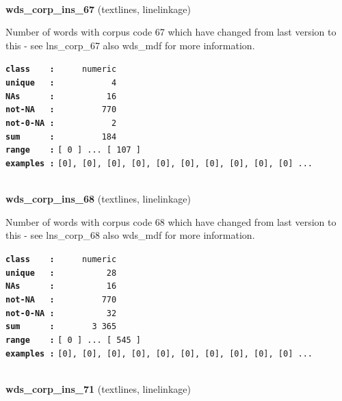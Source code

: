 \documentclass[]{article}
\begin{document}
~

\textbf{wds\_corp\_ins\_67} (textlines, linelinkage)

Number of words with corpus code 67 which have changed from last version
to this - see lns\_corp\_67 also wds\_mdf for more information.

\textbf{\texttt{class\ \ \ \ :}} \texttt{~~~~~numeric}\\
\textbf{\texttt{unique\ \ \ :}} \texttt{~~~~~~~~~~~4}\\
\textbf{\texttt{NAs\ \ \ \ \ \ :}} \texttt{~~~~~~~~~~16}\\
\textbf{\texttt{not-NA\ \ \ :}} \texttt{~~~~~~~~~770}\\
\textbf{\texttt{not-0-NA\ :}} \texttt{~~~~~~~~~~~2}\\
\textbf{\texttt{sum\ \ \ \ \ \ :}} \texttt{~~~~~~~~~184}\\
\textbf{\texttt{range\ \ \ \ :}}
\texttt{{[}\ 0\ {]}\ ...\ {[}\ 107\ {]}}\\
\textbf{\texttt{examples\ :}}
\texttt{{[}0{]},\ {[}0{]},\ {[}0{]},\ {[}0{]},\ {[}0{]},\ {[}0{]},\ {[}0{]},\ {[}0{]},\ {[}0{]},\ {[}0{]}\ ...}\\

~

\textbf{wds\_corp\_ins\_68} (textlines, linelinkage)

Number of words with corpus code 68 which have changed from last version
to this - see lns\_corp\_68 also wds\_mdf for more information.

\textbf{\texttt{class\ \ \ \ :}} \texttt{~~~~~numeric}\\
\textbf{\texttt{unique\ \ \ :}} \texttt{~~~~~~~~~~28}\\
\textbf{\texttt{NAs\ \ \ \ \ \ :}} \texttt{~~~~~~~~~~16}\\
\textbf{\texttt{not-NA\ \ \ :}} \texttt{~~~~~~~~~770}\\
\textbf{\texttt{not-0-NA\ :}} \texttt{~~~~~~~~~~32}\\
\textbf{\texttt{sum\ \ \ \ \ \ :}} \texttt{~~~~~~~3~365}\\
\textbf{\texttt{range\ \ \ \ :}}
\texttt{{[}\ 0\ {]}\ ...\ {[}\ 545\ {]}}\\
\textbf{\texttt{examples\ :}}
\texttt{{[}0{]},\ {[}0{]},\ {[}0{]},\ {[}0{]},\ {[}0{]},\ {[}0{]},\ {[}0{]},\ {[}0{]},\ {[}0{]},\ {[}0{]}\ ...}\\

~

\textbf{wds\_corp\_ins\_71} (textlines, linelinkage)
\end{document}
